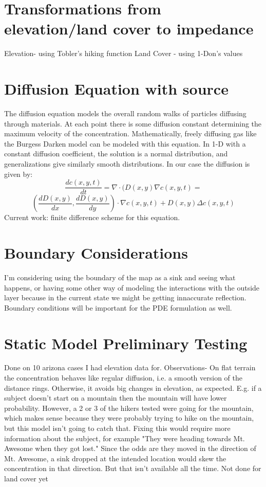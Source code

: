 \documentclass[]{article}
\begin{document}
\section{Transformations from elevation/land cover to impedance}
Elevation- using Tobler's hiking function
Land Cover - using 1-Don's values
\section{Diffusion Equation with source}
The diffusion equation models the overall random walks of particles diffusing through materials. At each point there is some diffusion constant determining the maximum velocity of the concentration. Mathematically, freely diffusing gas like the Burgess Darken model can be modeled with this equation. In 1-D with a constant diffusion coefficient, the solution is a normal distribution, and generalizations give similarly smooth distributions. In our case the diffusion is given by:
\[\frac{dc(x,y,t)}{dt}=\nabla \cdot(D(x,y)\nabla c(x,y,t)=\]
\[(\frac{dD(x,y)}{dx},\frac{dD(x,y)}{dy})\cdot\nabla c(x,y,t) + D(x,y)\Delta c(x,y,t)\]
Current work: finite difference scheme for this equation.
\section{Boundary Considerations}
I'm considering using the boundary of the map as a sink and seeing what happens, or having some other way of modeling the interactions with the outside layer because in the current state we might be getting innaccurate reflection. Boundary conditions will be important for the PDE formulation as well.

\section{Static Model Preliminary Testing}
Done on 10 arizona cases I had elevation data for. Observations- On flat terrain the concentration behaves like regular diffusion, i.e. a smooth version of the distance rings. Otherwise, it avoids big changes in elevation, as expected. E.g. if a subject doesn't start on a mountain then the mountain will have lower probability. However, a 2 or 3 of the hikers tested were going for the mountain, which makes sense because they were probably trying to hike on the mountain, but this model isn't going to catch that. Fixing this would require more information about the subject, for example "They were heading towards Mt. Awesome when they got lost." Since the odds are they moved in the direction of Mt. Awesome, a sink dropped at the intended location would skew the concentration in that direction. But that isn't available all the time.
Not done for land cover yet
\end{document}
